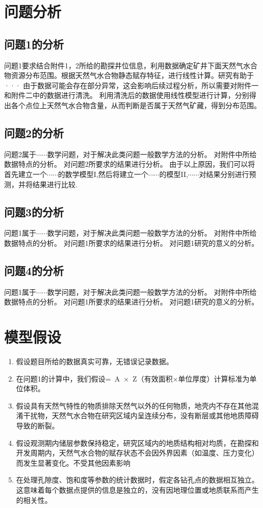 \documentclass[12pt,a4paper]{nmmcm}
\begin{document}
\section{问题分析}
\subsection{问题1的分析}

问题1要求结合附件1，2所给的勘探井位信息，利用数据确定矿井下面天然气水合物资源分布范围。根据天然气水合物静态赋存特征，进行线性计算。研究有助于···
由于数据可能会存在部分异常，这会影响后续过程分析，所以需要对附件一和附件二中的数据进行清洗。
利用清洗后的数据使用线性模型进行计算，分别得出各个点位上天然气水合物含量，从而判断是否属于天然气矿藏，得到分布范围。

\subsection{问题2的分析}
问题2属于$\cdots\cdots$数学问题，对于解决此类问题一般数学方法的分析。
对附件中所给数据特点的分析。
对问题2所要求的结果进行分析。
由于以上原因，我们可以将首先建立一个$\cdots\cdots$的数学模型I,然后将建立一个$\cdots\cdots$的模型II,$\cdots\cdots$对结果分别进行预测，并将结果进行比较.


\subsection{问题3的分析}
问题1属于$\cdots\cdots$数学问题，对于解决此类问题一般数学方法的分析。
对附件中所给数据特点的分析。
对问题1所要求的结果进行分析。
对问题1研究的意义的分析。

\subsection{问题4的分析}
问题1属于$\cdots\cdots$数学问题，对于解决此类问题一般数学方法的分析。
对附件中所给数据特点的分析。
对问题1所要求的结果进行分析。
对问题1研究的意义的分析。


\section{模型假设}
\begin{enumerate}
  \item 假设题目所给的数据真实可靠，无错误记录数据。
  \item 在问题1的计算中，我们假设= A × Z（有效面积×单位厚度）计算标准为单位体积。
  \item 假设具有天然气特性的物质排除天然气以外的任何物质，地壳内不存在其他混淆干扰物，天然气水合物在研究区域内呈连续分布，没有断层或其他地质障碍导致的断裂。
  \item 假设观测期内储层参数保持稳定，研究区域内的地质结构相对均质，在勘探和开发周期内，天然气水合物的赋存状态不会因外界因素（如温度、压力变化）而发生显著变化。不受其他因素影响
  \item 在处理孔隙度、饱和度等参数的统计数据时，假定各钻孔点的数据相互独立。这意味着每个数据点提供的信息是独立的，没有因地理位置或地质联系而产生的相关性。
\end{enumerate}
\end{document}
